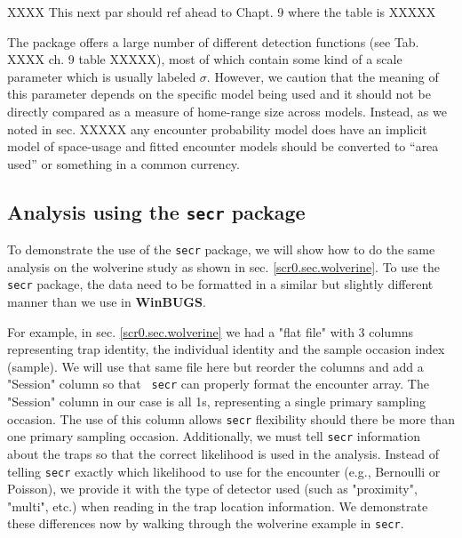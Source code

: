 XXXX This next par should ref ahead to Chapt. 9 where the table is  XXXXX


The package \secr offers a large number of different detection
functions (see Tab. XXXX ch. 9 table XXXXX), most of which contain
some kind of a scale parameter which is usually labeled
$\sigma$. However, we caution that the meaning of this parameter
depends on the specific model being used and it should not be directly
compared as a measure of home-range size across models. Instead, as we
noted in sec. XXXXX any encounter probability model does have an
implicit model of space-usage and fitted encounter models should be
converted to ``area used'' or something in a common currency. 



\subsection{ Analysis using the \mbox{\tt secr} package}

To demonstrate the use of the \mbox{\tt secr} package, we will show
how to do the same analysis on the wolverine study as shown in
sec. \ref{scr0.sec.wolverine}. To use the \mbox{\tt secr} package, the
data need to be formatted in a similar but slightly different manner
than we use in {\bf WinBUGS}.

For example, in sec. \ref{scr0.sec.wolverine} we had a "flat file"
with 3 columns representing trap identity, the individual identity and
the sample occasion index (sample).  We will use that same file here
but reorder the columns and add a "Session" column so that \mbox{\tt
  secr} can properly format the encounter array. The "Session" column
in our case is all 1s, representing a single primary sampling
occasion.  The use of this column allows \mbox{\tt secr} flexibility
should there be more than one primary sampling occasion.
Additionally, we must tell \mbox{\tt secr} information about the traps
so that the correct likelihood is used in the analysis.  Instead of
telling \mbox{\tt secr} exactly which likelihood to use for the
encounter (e.g., Bernoulli or Poisson), we provide it with the type of
detector used (such as "proximity", "multi", etc.) when reading in the
trap location information.  We demonstrate these differences now by
walking through the wolverine example in \mbox{\tt secr}.


